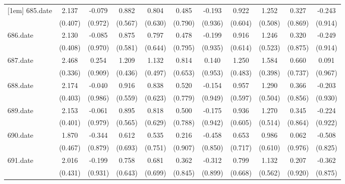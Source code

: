 \begin{tabular}{l*{10}{c}}
[1em]
685.date    &       2.137&      -0.079&       0.882&       0.804&       0.485&      -0.193&       0.922&       1.252&       0.327&      -0.243\\
            &     (0.407)&     (0.972)&     (0.567)&     (0.630)&     (0.790)&     (0.936)&     (0.604)&     (0.508)&     (0.869)&     (0.914)\\
[1em]
686.date    &       2.130&      -0.085&       0.875&       0.797&       0.478&      -0.199&       0.916&       1.246&       0.320&      -0.249\\
            &     (0.408)&     (0.970)&     (0.581)&     (0.644)&     (0.795)&     (0.935)&     (0.614)&     (0.523)&     (0.875)&     (0.914)\\
[1em]
687.date    &       2.468&       0.254&       1.209&       1.132&       0.814&       0.140&       1.250&       1.584&       0.660&       0.091\\
            &     (0.336)&     (0.909)&     (0.436)&     (0.497)&     (0.653)&     (0.953)&     (0.483)&     (0.398)&     (0.737)&     (0.967)\\
[1em]
688.date    &       2.174&      -0.040&       0.916&       0.838&       0.520&      -0.154&       0.957&       1.290&       0.366&      -0.203\\
            &     (0.403)&     (0.986)&     (0.559)&     (0.623)&     (0.779)&     (0.949)&     (0.597)&     (0.504)&     (0.856)&     (0.930)\\
[1em]
689.date    &       2.153&      -0.061&       0.895&       0.818&       0.500&      -0.175&       0.936&       1.270&       0.345&      -0.224\\
            &     (0.401)&     (0.979)&     (0.565)&     (0.629)&     (0.788)&     (0.942)&     (0.605)&     (0.514)&     (0.864)&     (0.922)\\
[1em]
690.date    &       1.870&      -0.344&       0.612&       0.535&       0.216&      -0.458&       0.653&       0.986&       0.062&      -0.508\\
            &     (0.467)&     (0.879)&     (0.693)&     (0.751)&     (0.907)&     (0.850)&     (0.717)&     (0.610)&     (0.976)&     (0.825)\\
[1em]
691.date    &       2.016&      -0.199&       0.758&       0.681&       0.362&      -0.312&       0.799&       1.132&       0.207&      -0.362\\
            &     (0.431)&     (0.931)&     (0.643)&     (0.699)&     (0.845)&     (0.899)&     (0.668)&     (0.562)&     (0.920)&     (0.875)\\

\end{tabular}
